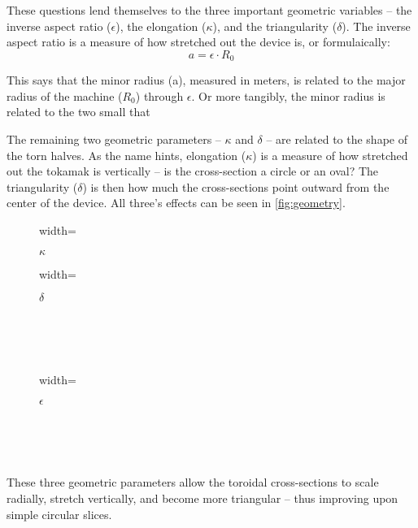 These questions lend themselves to the three important geometric variables -- the inverse aspect ratio ($\epsilon$), the elongation ($\kappa$), and the triangularity ($\delta$). The inverse aspect ratio is a measure of how stretched out the device is, or formulaically:
\begin{equation}
	\label{eq:a}
	a = \epsilon \cdot R_0
\end{equation}

This says that the minor radius (a), measured in meters, is related to the major radius of the machine ($R_0$) through $\epsilon$. Or more tangibly, the minor radius is related to the two small  that  

The remaining two geometric parameters -- $\kappa$ and $\delta$ -- are related to the shape of the torn halves. As the name hints, elongation ($\kappa$) is a measure of how stretched out the tokamak is vertically -- is the cross-section a circle or an oval? The triangularity ($\delta$) is then how much the cross-sections point outward from the center of the device. All three's effects can be seen in \cref{fig:geometry}. 

\begin{figure*}[h]
    \centering
    \hfill 
    \begin{subfigure}[t]{0.45\textwidth}
        \centering
		\begin{adjustbox}{width=\textwidth}
			\Large
			
		\end{adjustbox}
        \caption{$\kappa$}
    \end{subfigure}
    \hfill
    \begin{subfigure}[t]{0.45\textwidth}
        \centering
		\begin{adjustbox}{width=\textwidth}
			\Large
			
		\end{adjustbox}
        \caption{$\delta$}
    \end{subfigure}
    \hfill \hfill ~\\ ~\\ ~\\
    \begin{subfigure}[t]{0.6\textwidth}
        \centering
		\begin{adjustbox}{width=\textwidth}
			\large
			
		\end{adjustbox}
        \caption{$\epsilon$}
    \end{subfigure} ~\\ ~\\
    \caption{Geometric Parameters} ~\\
    \small These three geometric parameters allow the toroidal cross-sections to scale radially, stretch vertically, and become more triangular -- thus improving upon simple circular slices.
    \label{fig:geometry}
\end{figure*}

